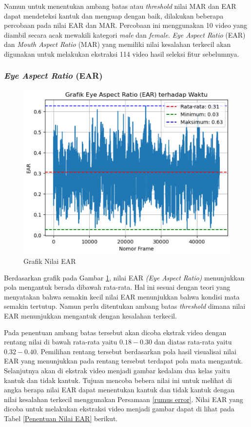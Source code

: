     Namun untuk menentukan ambang batas atau \textit{threshold} nilai MAR dan EAR dapat mendeteksi kantuk dan menguap dengan baik, dilakukan beberapa  percobaan pada nilai EAR dan MAR. Percobaan ini menggunakan 10 video yang diambil secara acak mewakili kategori \textit{male} dan \textit{female}. \textit{Eye Aspect Ratio} (EAR) dan \textit{Mouth Aspect Ratio} (MAR) yang memiliki nilai kesalahan terkecil akan digunakan untuk melakukan ekstraksi 114 video hasil seleksi fitur sebelumnya.

\subsubsection{\textit{Eye Aspect Ratio} (EAR)}

        
         \begin{figure}[H]
             \centering
             \includegraphics[width=0.75\linewidth]{figures/bab4/nilai ear.png}
             \caption{Grafik Nilai EAR}
             \label{Grafik Nilai EAR}
         \end{figure}

            Berdasarkan grafik pada Gambar \ref{Grafik Nilai EAR}, nilai EAR \textit{(Eye Aspect Ratio)} menunjukkan pola mengantuk berada dibawah rata-rata. Hal ini sesuai dengan teori yang menyatakan bahwa semakin kecil nilai EAR menunjukkan bahwa kondisi mata semakin tertutup. Namun perlu ditentukan ambang batas \textit{threshold} dimana nilai EAR menunjukkan mengantuk dengan kesalahan terkecil.
            
            Pada penentuan ambang batas tersebut akan dicoba ekstrak video dengan rentang nilai di bawah rata-rata yaitu $0.18 - 0.30$ dan diatas rata-rata yaitu $0.32 - 0.40$. Pemilihan rentang tersebut berdasarkan pola hasil visualisai nilai EAR yang menunjukkan pada rentang tersebut terdapat pola mata mengantuk. Selanjutnya akan di ekstrak video menjadi gambar kedalam dua kelas yaitu kantuk dan tidak kantuk. Tujuan mencoba bebera nilai ini untuk melihat di angka berapa nilai EAR dapat menentukan kantuk dan tidak kantuk dengan nilai kesalahan terkecil menggunakan Persamaan \ref{rumus error}. Nilai EAR yang dicoba untuk melakukan ekstraksi video menjadi gambar dapat di lihat pada Tabel \ref{Penentuan Nilai EAR} berikut.\\


